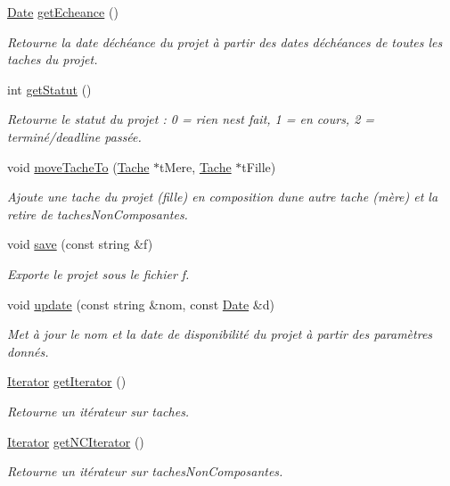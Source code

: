 \begin{DoxyCompactItemize}
\hyperlink{class_t_i_m_e_1_1_date}{Date} \hyperlink{class_projet_ad59a01337678059ac21e225dd3f41743}{get\+Echeance} ()
\begin{DoxyCompactList}\small\item\em Retourne la date d\textquotesingle{}échéance du projet à partir des dates d\textquotesingle{}échéances de toutes les taches du projet. \end{DoxyCompactList}\item 
int \hyperlink{class_projet_a04e9427d95b848a08551818f88246ebb}{get\+Statut} ()
\begin{DoxyCompactList}\small\item\em Retourne le statut du projet \+: 0 = rien n\textquotesingle{}est fait, 1 = en cours, 2 = terminé/deadline passée. \end{DoxyCompactList}\item 
void \hyperlink{class_projet_ad8ea587dd12362c4e8867a043e81ca1e}{move\+Tache\+To} (\hyperlink{class_tache}{Tache} $\ast$t\+Mere, \hyperlink{class_tache}{Tache} $\ast$t\+Fille)
\begin{DoxyCompactList}\small\item\em Ajoute une tache du projet (fille) en composition d\textquotesingle{}une autre tache (mère) et la retire de taches\+Non\+Composantes. \end{DoxyCompactList}\item 
void \hyperlink{class_projet_a59cdf68a1ac1940b2c58ff93f800a8b9}{save} (const string \&f)
\begin{DoxyCompactList}\small\item\em Exporte le projet sous le fichier f. \end{DoxyCompactList}\item 
void \hyperlink{class_projet_adb2a5742c64f6bac21022b313033edcd}{update} (const string \&nom, const \hyperlink{class_t_i_m_e_1_1_date}{Date} \&d)
\begin{DoxyCompactList}\small\item\em Met à jour le nom et la date de disponibilité du projet à partir des paramètres donnés. \end{DoxyCompactList}\item 
\hyperlink{class_projet_1_1_iterator}{Iterator} \hyperlink{class_projet_acb3ac5233074e53f0263bd50b4e0bdec}{get\+Iterator} ()
\begin{DoxyCompactList}\small\item\em Retourne un itérateur sur taches. \end{DoxyCompactList}\item 
\hyperlink{class_projet_1_1_iterator}{Iterator} \hyperlink{class_projet_acdfd076d0ad992fb0d12b2314b3ab70a}{get\+N\+C\+Iterator} ()
\begin{DoxyCompactList}\small\item\em Retourne un itérateur sur taches\+Non\+Composantes. \end{DoxyCompactList}\end{DoxyCompactItemize}
